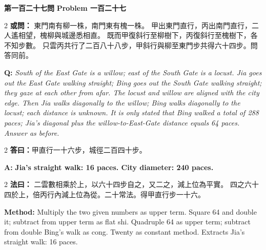 \documentclass[11pt,a4paper]{article}
\newcommand{\wen}[1]{%
  \par\vspace{0.5em}%
  \noindent\textcolor{problemcolor}{\textbf{第#1問}}%
  \hfill\textcolor{problemcolor}{\textbf{Problem #1}}\par\nopagebreak%
  \vspace{0.3em}%
}
\newcommand{\owen}[1]{%
  \noindent\textcolor{problemcolor}{\textbf{或問：}}{\tradfont #1}\par\nopagebreak%
}
\newcommand{\oweneng}[1]{%
  \noindent\textcolor{engcolor}{\textbf{Q: }}{\itshape #1}\par\nopagebreak%
}
\newcommand{\fayue}[1]{%
  \noindent\textcolor{methodcolor}{\textbf{法曰：}}{\tradfont #1}\par\nopagebreak%
}
\newcommand{\fayueeng}[1]{%
  \noindent\textcolor{engcolor}{\textbf{Method: }}{#1}\par\nopagebreak%
}
\newcommand{\dayue}[1]{%
  \noindent\textcolor{anscolor}{\textbf{答曰：}}{\tradfont #1}\par\nopagebreak%
}
\newcommand{\dayueeng}[1]{%
  \noindent\textcolor{engcolor}{\textbf{A: }}{\bfseries #1}\par\nopagebreak%
}
\begin{document}
\vspace{0.5cm}

\wen{一百二十七}

\begin{paracol}{2}
\owen{%
東門南有柳一株，南門東有槐一株。
甲出東門直行，丙出南門直行，二人遙相望，槐柳與城邊悉相直。
既而甲復斜行至柳樹下，丙復斜行至槐樹下，各不知步數。
只雲丙共行了二百八十八步，甲斜行與柳至東門步共得六十四步。問答同前。}
\switchcolumn
\oweneng{%
South of the East Gate is a willow; east of the South Gate is a locust. Jia goes out the East Gate walking straight; Bing goes out the South Gate walking straight; they gaze at each other from afar. The locust and willow are aligned with the city edge. Then Jia walks diagonally to the willow; Bing walks diagonally to the locust; each distance is unknown. It is only stated that Bing walked a total of 288 paces; Jia's diagonal plus the willow-to-East-Gate distance equals 64 paces. Answer as before.}
\end{paracol}

\begin{paracol}{2}
\dayue{甲直行一十六步，城徑二百四十步。}
\switchcolumn
\dayueeng{Jia's straight walk: 16 paces. City diameter: 240 paces.}
\end{paracol}

\begin{paracol}{2}
\fayue{%
二雲數相乘於上，以六十四步自之，又二之，減上位為平實。
四之六十四於上，倍丙行內減上位為從。二十常法。得甲直行步一十六。}
\switchcolumn
\fayueeng{%
Multiply the two given numbers as upper term. Square 64 and double it; subtract from upper term as flat shi. Quadruple 64 as upper term; subtract from double Bing's walk as cong. Twenty as constant method. Extracts Jia's straight walk: 16 paces.}
\end{paracol}
\end{document}
